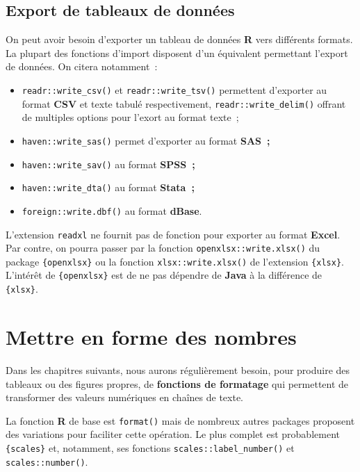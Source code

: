 \documentclass[
  letterpaper,
  DIV=11,
  numbers=noendperiod,
  oneside]{scrreprt}
\providecommand{\tightlist}{%
  \setlength{\itemsep}{0pt}\setlength{\parskip}{0pt}}\usepackage{longtable,booktabs,array}
\begin{document}
\hypertarget{export-de-tableaux-de-donnuxe9es}{%
\section{Export de tableaux de
données}\label{export-de-tableaux-de-donnuxe9es}}

On peut avoir besoin d'exporter un tableau de données \textbf{R} vers
différents formats. La plupart des fonctions d'import disposent d'un
équivalent permettant l'export de données. On citera notamment~:

\begin{itemize}
\tightlist
\item
  \texttt{readr::write\_csv()} et \texttt{readr::write\_tsv()}
  permettent d'exporter au format \textbf{CSV} et texte tabulé
  respectivement, \texttt{readr::write\_delim()} offrant de multiples
  options pour l'exort au format texte~;
\item
  \texttt{haven::write\_sas()} permet d'exporter au format
  \textbf{SAS~;}
\item
  \texttt{haven::write\_sav()} au format \textbf{SPSS~;}
\item
  \texttt{haven::write\_dta()} au format \textbf{Stata~;}
\item
  \texttt{foreign::write.dbf()} au format \textbf{dBase}.
\end{itemize}

L'extension \texttt{readxl} ne fournit pas de fonction pour exporter au
format \textbf{Excel}. Par contre, on pourra passer par la fonction
\texttt{openxlsx::write.xlsx()} du package \texttt{\{openxlsx\}} ou la
fonction \texttt{xlsx::write.xlsx()} de l'extension \texttt{\{xlsx\}}.
L'intérêt de \texttt{\{openxlsx\}} est de ne pas dépendre de
\textbf{Java} à la différence de \texttt{\{xlsx\}}.

\hypertarget{sec-formater-nombre}{%
\chapter{Mettre en forme des nombres}\label{sec-formater-nombre}}

Dans les chapitres suivants, nous aurons régulièrement besoin, pour
produire des tableaux ou des figures propres, de \textbf{fonctions de
formatage} qui permettent de transformer des valeurs numériques en
chaînes de texte.

La fonction \textbf{R} de base est \texttt{format()} mais de nombreux
autres packages proposent des variations pour faciliter cette opération.
Le plus complet est probablement \texttt{\{scales\}} et, notamment, ses
fonctions \texttt{scales::label\_number()} et \texttt{scales::number()}.
\end{document}
